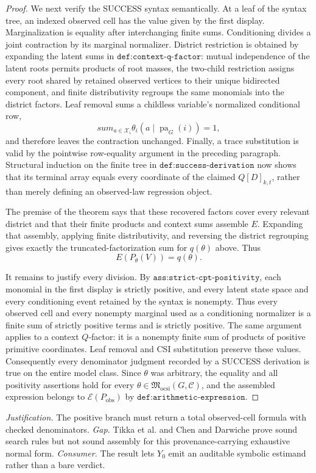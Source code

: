 \documentclass{article}
\begin{document}
\begin{proof}
We next verify the SUCCESS syntax semantically. At a leaf of the syntax tree, an indexed observed cell has the value given by the first display. Marginalization is equality after interchanging finite sums. Conditioning divides a joint contraction by its marginal normalizer. District restriction is obtained by expanding the latent sums in \(\texttt{def:context-q-factor}\): mutual independence of the latent roots permits products of root masses, the two-child restriction assigns every root shared by retained observed vertices to their unique bidirected component, and finite distributivity regroups the same monomials into the district factors. Leaf removal sums a childless variable's normalized conditional row,
\[
 sum_{a\in\mathcal X_i}\theta_i(a\mid\operatorname{pa}_G(i))=1,
\]
and therefore leaves the contraction unchanged. Finally, a trace substitution is valid by the pointwise row-equality argument in the preceding paragraph. Structural induction on the finite tree in \(\texttt{def:success-derivation}\) now shows that its terminal array equals every coordinate of the claimed \(Q[D]_{k,t}\), rather than merely defining an observed-law regression object.

The premise of the theorem says that these recovered factors cover every relevant district and that their finite products and context sums assemble \(E\). Expanding that assembly, applying finite distributivity, and reversing the district regrouping gives exactly the truncated-factorization sum for \(q(\theta)\) above. Thus
\[
 E(P_\theta(V))=q(\theta).
\]

It remains to justify every division. By \(\texttt{ass:strict-cpt-positivity}\), each monomial in the first display is strictly positive, and every latent state space and every conditioning event retained by the syntax is nonempty. Thus every observed cell and every nonempty marginal used as a conditioning normalizer is a finite sum of strictly positive terms and is strictly positive. The same argument applies to a context \(Q\)-factor: it is a nonempty finite sum of products of positive primitive coordinates. Leaf removal and CSI substitution preserve these values. Consequently every denominator judgment recorded by a SUCCESS derivation is true on the entire model class. Since \(\theta\) was arbitrary, the equality and all positivity assertions hold for every \(\theta\in\mathfrak M_{\mathrm{ocsi}}(G,\mathcal C)\), and the assembled expression belongs to \(\mathscr E(P_{\mathrm{obs}})\) by \(\texttt{def:arithmetic-expression}\).
\end{proof}
\par\smallskip\noindent \textit{Justification.} The positive branch must return a total observed-cell formula with checked denominators. \textit{Gap.} Tikka et al. and Chen and Darwiche prove sound search rules but not sound assembly for this provenance-carrying exhaustive normal form. \textit{Consumer.} The result lets \(Y_0\) emit an auditable symbolic estimand rather than a bare verdict.
\end{document}
